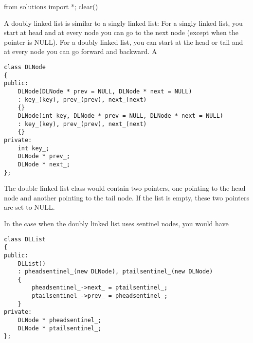 \begin{python0}
from solutions import *; clear()
\end{python0}

A doubly linked list is similar to a singly linked list:
For a singly linked list, you start at head
and at every node you can go to the next node (except
when the pointer is NULL).
For a doubly linked list, you can start at the head or tail
and at every node you can go forward and backward.
A


\begin{Verbatim}[frame=single,fontsize=\footnotesize]
class DLNode
{
public:
    DLNode(DLNode * prev = NULL, DLNode * next = NULL)
    : key_(key), prev_(prev), next_(next)
    {}
    DLNode(int key, DLNode * prev = NULL, DLNode * next = NULL)
    : key_(key), prev_(prev), next_(next)
    {}
private:
    int key_;
    DLNode * prev_;
    DLNode * next_;
};
\end{Verbatim}

The double linked list class would contain two pointers,
one pointing to the head node
and another pointing to the tail node.
If the list is empty, these two pointers are set to NULL.

In the case when the doubly linked list uses
sentinel nodes, you would have
\begin{Verbatim}[frame=single,fontsize=\footnotesize]
class DLList
{
public:
    DLList()
    : pheadsentinel_(new DLNode), ptailsentinel_(new DLNode)
    {
        pheadsentinel_->next_ = ptailsentinel_;
        ptailsentinel_->prev_ = pheadsentinel_;      
    }
private:
    DLNode * pheadsentinel_;
    DLNode * ptailsentinel_;
};
\end{Verbatim}


\newpage
